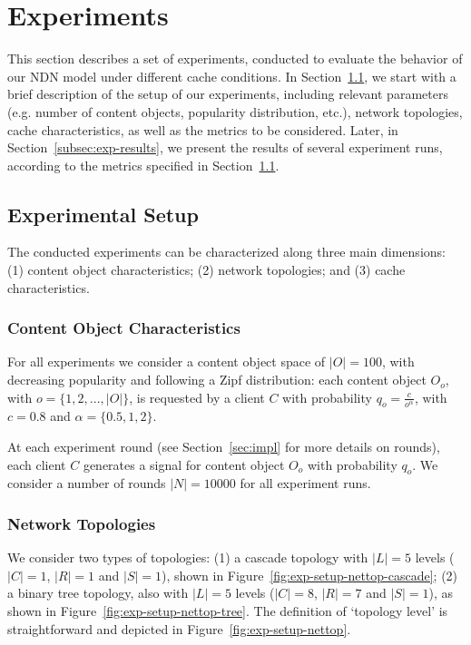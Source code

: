 \section{Experiments}
\label{sec:experiments}

This section describes a set of experiments, conducted to evaluate 
the behavior of our NDN model under different cache conditions. In 
Section~\ref{subsec:exp-setup}, we start 
with a brief description of the setup of our experiments, 
including relevant parameters (e.g. number of content objects, popularity 
distribution, etc.), network topologies, cache characteristics, as well as the 
metrics to be considered. Later, in Section~\ref{subsec:exp-results}, we 
present the results of several experiment runs, according to the metrics 
specified in Section~\ref{subsec:exp-setup}.

\subsection{Experimental Setup}
\label{subsec:exp-setup}

The conducted experiments can be characterized along three main dimensions: (1) 
content object characteristics; (2) network topologies; and (3) cache 
characteristics.\shortvertbreak

\subsubsection{Content Object Characteristics}
\label{subsec:exp-setup-cobj}

For all experiments we consider a content object space of 
$|O| = 100$, with decreasing popularity and following a Zipf distribution: 
each content object $O_o$, with $o = \{1,2,...,|O|\}$, is requested by a client 
$C$ with probability $q_{o} = \frac{c}{o^{\alpha}}$, with $c = 0.8$ and 
$\alpha = \{0.5, 1, 2\}$.\shortvertbreak

At each experiment round (see Section~\ref{sec:impl} for more details on 
rounds), each client $C$ generates a signal for content object $O_o$ with 
probability $q_{o}$. We consider a number of rounds 
$|N| = 10000$ for all experiment runs.\shortvertbreak

\subsubsection{Network Topologies}
\label{subsec:exp-setup-nettop}

We consider two types of topologies: (1) a cascade topology with $|L| = 5$ levels 
($|C| = 1$, $|R| = 1$ and $|S| = 1$), shown in Figure~\ref{fig:exp-setup-nettop-cascade}; (2) a binary 
tree topology, also with $|L| = 5$ levels ($|C| = 8$, $|R| = 7$ and $|S| = 1$), as 
shown in Figure~\ref{fig:exp-setup-nettop-tree}. The definition of `topology level' is straightforward and depicted 
in Figure~\ref{fig:exp-setup-nettop}.\shortvertbreak

